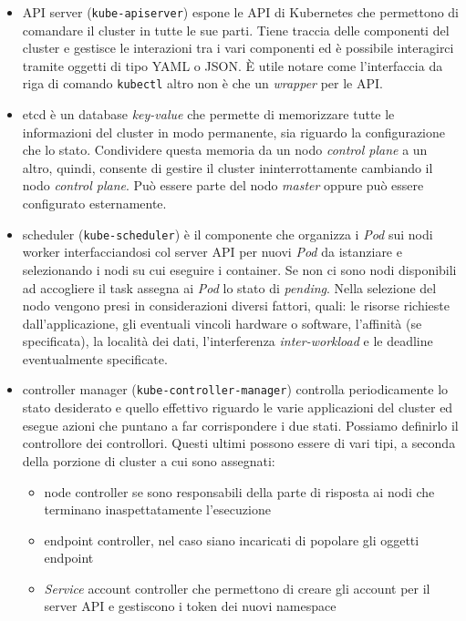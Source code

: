 \documentclass[12pt, hidelinks]{report}
\begin{document}
\begin{itemize}
    \item API server (\texttt{kube-apiserver}) espone le API di Kubernetes che permettono di comandare il cluster in tutte le sue parti. Tiene traccia delle componenti del cluster e gestisce le interazioni tra i vari componenti ed è possibile interagirci tramite oggetti di tipo YAML o JSON. È utile notare come l'interfaccia da riga di comando \texttt{kubectl} altro non è che un \textit{wrapper} per le API.
    \item etcd è un database \textit{key-value} che permette di memorizzare tutte le informazioni del cluster in modo permanente, sia riguardo la configurazione che lo stato. Condividere questa memoria da un nodo \textit{control plane} a un altro, quindi, consente di gestire il cluster ininterrottamente cambiando il nodo \textit{control plane}. Può essere parte del nodo \textit{master} oppure può essere configurato esternamente.
    \item scheduler (\texttt{kube-scheduler}) è il componente che organizza i \textit{Pod} sui nodi worker interfacciandosi col server API per nuovi \textit{Pod} da istanziare e selezionando i nodi su cui eseguire i container. Se non ci sono nodi disponibili ad accogliere il task assegna ai \textit{Pod} lo stato di \textit{pending}. Nella selezione del nodo vengono presi in considerazioni diversi fattori, quali: le risorse richieste dall'applicazione, gli eventuali vincoli hardware o software, l'affinità (se specificata), la località dei dati, l'interferenza \textit{inter-workload} e le deadline eventualmente specificate.
    \item controller manager (\texttt{kube-controller-manager}) controlla periodicamente lo stato desiderato e quello effettivo riguardo le varie applicazioni del cluster ed esegue azioni che puntano a far corrispondere i due stati. Possiamo definirlo il controllore dei controllori. Questi ultimi possono essere di vari tipi, a seconda della porzione di cluster a cui sono assegnati:
    
    \begin{itemize}
        \item node controller se sono responsabili della parte di risposta ai nodi che terminano inaspettatamente l'esecuzione
        \item endpoint controller, nel caso siano incaricati di popolare gli oggetti endpoint
        \item \textit{Service}  account controller che permettono di creare gli account per il server API e gestiscono i token dei nuovi namespace
    \end{itemize}
\end{itemize}
\end{document}
